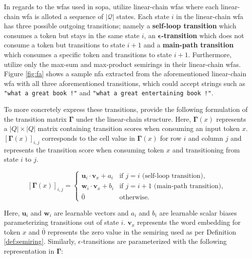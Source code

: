 In regards to the \ac{wfas} used in \ac{sopa}, \citet{schwartz2018sopa} utilize
linear-chain \ac{wfas} where each linear-chain \ac{wfa} is alloted a sequence of
$|\mathcal{Q}|$ states. Each state $i$ in the linear-chain \ac{wfa} has three
possible outgoing transitions; namely a \textbf{self-loop transition} which
consumes a token but stays in the same state $i$, an
\textbf{$\bm{\epsilon}$-transition} which does not consume a token but transitions to
state $i+1$ and a \textbf{main-path transition} which consumes a specific token
and transitions to state $i+1$. Furthermore, \citet{schwartz2018sopa} utilize
only the max-sum and max-product semirings in their linear-chain \ac{wfas}. Figure
\ref{fig:fa} shows a sample \ac{nfa} extracted from the aforementioned linear-chain
\ac{wfa} with all three aforementioned transitions, which could accept
strings such as \texttt{"what a great book !"} and \texttt{"what a great
  entertaining book !"}.

To more concretely express these transitions, \citet{schwartz2018sopa} provide
the following formulation of the transition matrix $\bm{\Gamma}$ under the
linear-chain structure. Here, $\bm{\Gamma}(x)$ represents a $|Q|\times|Q|$ matrix
containing transition scores when consuming an input token $x$. $[\bm{\Gamma}(x)]_{i,j}$
corresponds to the cell value in $\bm{\Gamma}(x)$ for row $i$ and column
$j$ and represents the transition score when consuming token $x$ and
transitioning from state $i$ to $j$.

\begin{equation}
  \label{eq:sopa_transition_matrix_main}
  [\bm{\Gamma}(x)]_{i,j} =
  \begin{cases}
    \bm{u}_i \cdot \bm{v}_x + a_i  & \text{if } j = i \text{ (self-loop transition),} \\
    \bm{w}_i \cdot \bm{v}_x + b_i  & \text{if } j = i + 1 \text{ (main-path transition),} \\
    \bar{0} & \text{otherwise.}
  \end{cases}
\end{equation}

Here, $\bm{u}_i$ and $\bm{w}_i$ are learnable vectors and $a_i$ and $b_i$ are
learnable scalar biases parameterizing transitions out of state $i$. $\bm{v}_x$
represents the word embedding for token $x$ and $\bar{0}$ represents the zero
value in the semiring used as per Definition \ref{def:semiring}. Similarly,
$\epsilon$-transitions are parameterized with the following representation in
$\bm{\Gamma}$:

